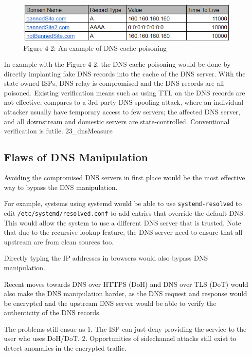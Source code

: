\documentclass[nonacm,sigplan,screen]{acmart}
\begin{document}
\begin{figure}
\centering
\includegraphics[width=\columnwidth]{res/4.2-DNS-poisoned.png}
\caption{Figure 4-2: An example of DNS cache poisoning}
\end{figure}

In example with the Figure 4-2, the DNS cache poisoning would be done by
directly implanting fake DNS records into the cache of the DNS server.
With the state-owned ISPs, DNS relay is compromised and the DNS records
are all poisoned. Existing verification means such as using TTL on the
DNS records are not effective, compares to a 3rd party DNS spoofing
attack, where an individual attacker usually have temporary access to
few servers; the affected DNS server, and all downstream and domestic
servers are state-controlled. Conventional verification is futile.
23\_dnsMeasure

\hypertarget{flaws-of-dns-manipulation}{%
\subsection{Flaws of DNS Manipulation}\label{flaws-of-dns-manipulation}}

Avoiding the compromised DNS servers in first place would be the most
effective way to bypass the DNS manipulation.

For example, systems using systemd would be able to use
\texttt{systemd-resolved} to edit \texttt{/etc/systemd/resolved.conf} to
add entries that override the default DNS. This would allow the system
to use a different DNS server that is trusted. Note that due to the
recursive lookup feature, the DNS server need to ensure that all
upstream are from clean sources too.

Directly typing the IP addresses in browsers would also bypass DNS
manipulation.

Recent moves towards DNS over HTTPS (DoH) and DNS over TLS (DoT) would
also make the DNS manipulation harder, as the DNS request and response
would be encrypted and the upstream DNS server would be able to verify
the authenticity of the DNS records.

The problems still ensue as 1. The ISP can just deny providing the
service to the user who uses DoH/DoT. 2. Opportunities of sidechannel
attacks still exist to detect anomalies in the encrypted traffic.
\end{document}
